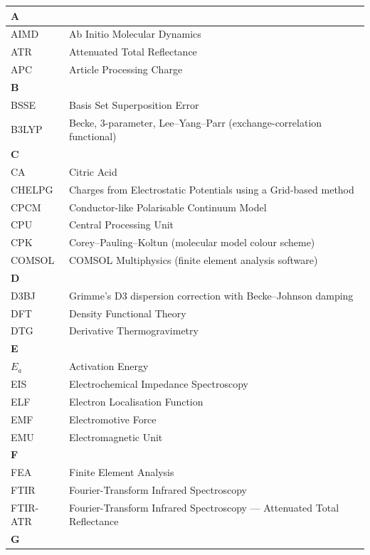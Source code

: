 \documentclass[12pt,a4paper]{report}
\begin{document}
\begin{center}
\begin{longtable}{p{2.5cm} p{12cm}}
\hline
\multicolumn{2}{l}{\textbf{A}} \\
\hline
AIMD & Ab Initio Molecular Dynamics \\
ATR & Attenuated Total Reflectance \\
APC & Article Processing Charge \\
\hline
\multicolumn{2}{l}{\textbf{B}} \\
\hline
BSSE & Basis Set Superposition Error \\
B3LYP & Becke, 3-parameter, Lee–Yang–Parr (exchange-correlation functional) \\
\hline
\multicolumn{2}{l}{\textbf{C}} \\
\hline
CA & Citric Acid \\
CHELPG & Charges from Electrostatic Potentials using a Grid-based method \\
CPCM & Conductor-like Polarisable Continuum Model \\
CPU & Central Processing Unit \\
CPK & Corey–Pauling–Koltun (molecular model colour scheme) \\
COMSOL & COMSOL Multiphysics (finite element analysis software) \\
\hline
\multicolumn{2}{l}{\textbf{D}} \\
\hline
D3BJ & Grimme's D3 dispersion correction with Becke–Johnson damping \\
DFT & Density Functional Theory \\
DTG & Derivative Thermogravimetry \\
\hline
\multicolumn{2}{l}{\textbf{E}} \\
\hline
\(E_a\) & Activation Energy \\
EIS & Electrochemical Impedance Spectroscopy \\
ELF & Electron Localisation Function \\
EMF & Electromotive Force \\
EMU & Electromagnetic Unit \\
\hline
\multicolumn{2}{l}{\textbf{F}} \\
\hline
FEA & Finite Element Analysis \\
FTIR & Fourier-Transform Infrared Spectroscopy \\
FTIR-ATR & Fourier-Transform Infrared Spectroscopy — Attenuated Total Reflectance \\
\hline
\multicolumn{2}{l}{\textbf{G}} \\

\end{longtable}
\end{center}
\end{document}
